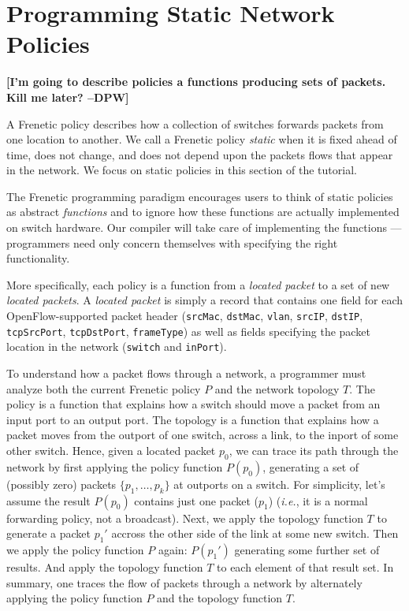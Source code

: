 \documentclass{article}
\newcommand{\finish}[2][cornellred]{\ifdraft\textcolor{#1}{\textbf{[#2]}}\fi}
\newcommand{\dpw}[1]{\finish[cornellred]{#1 --DPW}}
\newcommand{\code}[1]{\texttt{#1}}
\newcommand{\ie}{\emph{i.e.}}
\begin{document}
\section{Programming Static Network Policies}

\dpw{I'm going to describe policies a functions producing sets of packets.
Kill me later?}

A Frenetic policy describes how a collection of switches
forwards packets from one location to another.  We call a Frenetic policy
\emph{static} when it is fixed ahead of time,
does not change, and does not depend upon the packets flows that
appear in the network.  We focus on static policies in this
section of the tutorial.

The Frenetic programming paradigm encourages users to think of static
policies as abstract \emph{functions} and to ignore how these functions
are actually implemented on switch hardware.  Our compiler will take
care of implementing the functions --- programmers need only concern
themselves with specifying the right functionality.  

More specifically, each policy is a function
from a \emph{located packet} to a set of new \emph{located packets}.
A \emph{located packet} is simply a record that contains one
field for each OpenFlow-supported packet header (\code{srcMac}, \code{dstMac},
\code{vlan}, \code{srcIP}, \code{dstIP}, \code{tcpSrcPort}, \code{tcpDstPort}, 
\code{frameType}) as well as fields specifying the packet location 
in the network (\code{switch} and \code{inPort}).

To understand how a packet flows through a network, a programmer must
analyze both the current Frenetic policy $P$ and the network topology
$T$.  The policy is a function that explains how a switch should move
a packet from an input port to an output port.  The topology is a
function that explains how a packet moves from the outport of one
switch, across a link, to the inport of some other switch.  Hence,
given a located packet $p_0$, we can trace its path through the
network by first applying the policy function $P(p_0)$, generating a
set of (possibly zero) packets $\{p_1,\ldots,p_k\}$ at outports on a
switch.  For simplicity, let's assume the result $P(p_0)$ contains
just one packet ($p_1$) (\ie, it is a normal forwarding policy, not a
broadcast).  Next, we apply the topology function $T$ to generate a
packet $p_1'$ accross the other side of the link at some new switch.
Then we apply the policy function $P$ again: $P(p_1')$ generating some
further set of results.  And apply the topology function $T$ to each
element of that result set.  In summary, one traces the flow of
packets through a network by alternately applying the policy function
$P$ and the topology function $T$.
\end{document}
